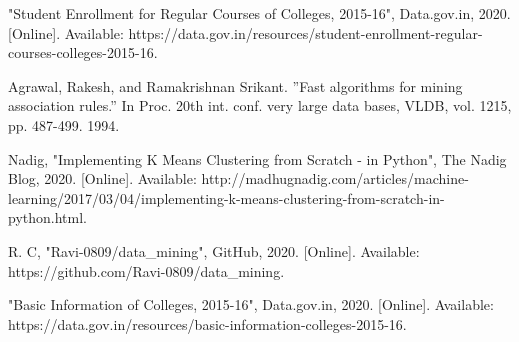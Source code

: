 \begin{thebibliography}{00}

 "Student Enrollment for Regular Courses of Colleges, 2015-16", Data.gov.in, 2020. [Online]. Available: https://data.gov.in/resources/student-enrollment-regular-courses-colleges-2015-16.

 Agrawal, Rakesh, and Ramakrishnan Srikant. ”Fast algorithms for mining association rules.” In Proc. 20th int. conf. very large data bases, VLDB, vol. 1215, pp. 487-499. 1994.

 Nadig, "Implementing K Means Clustering from Scratch - in Python", The Nadig Blog, 2020. [Online]. Available: http://madhugnadig.com/articles/machine-learning/2017/03/04/implementing-k-means-clustering-from-scratch-in-python.html.

 R. C, "Ravi-0809/data\_mining", GitHub, 2020. [Online]. Available: https://github.com/Ravi-0809/data\_mining.

 "Basic Information of Colleges, 2015-16", Data.gov.in, 2020. [Online]. Available: https://data.gov.in/resources/basic-information-colleges-2015-16.

\end{thebibliography}
